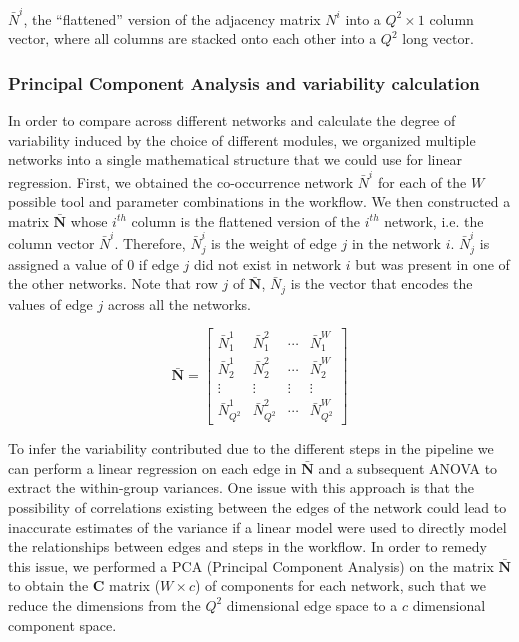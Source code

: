 \documentclass[letterpaper,12pt]{article}
\begin{document}
  $\bar{N}^i$, the ``flattened'' version of the adjacency matrix $N^i$ into a $Q^2 \times 1$ column vector, where all columns are stacked onto each other into a $Q^2$ long vector.


  \subsubsection*{Principal Component Analysis and variability calculation}
  \vspace{-5mm}
   In order to compare across different networks and calculate the degree of variability induced by the choice of different modules, we organized multiple networks into a single mathematical structure that we could use for linear regression.
   First, we obtained the co-occurrence network $\bar{N}^i$ for each of the $W$ possible tool and parameter combinations in the workflow.
   We then constructed a matrix $\mathbf{\bar{N}}$ whose $i^{th}$ column is the flattened version of the $i^{th}$ network, i.e. the column vector $\bar{N}^i$.
   Therefore, $\bar{N}^i_j$ is the weight of edge $j$ in the network $i$.
   $\bar{N}^i_j$ is assigned a value of 0 if edge $j$ did not exist in network $i$ but was present in one of the other networks.
   Note that row $j$ of $\mathbf{\bar{N}}$, $\bar{N}_j$ is the vector that encodes the values of edge $j$ across all the networks.

  \begin{equation*}
   \mathbf{\bar{N}} =
      \begin{bmatrix}
       \bar{N}^1_1 & \bar{N}^2_1 & \cdots  & \bar{N}^{W}_1  \\
       \bar{N}^1_2 & \bar{N}^2_2 & \cdots  & \bar{N}^{W}_2 \\
       \vdots & \vdots & \vdots  & \vdots \\
       \bar{N}^1_{Q^2} & \bar{N}^2_{Q^2} & \cdots  & \bar{N}^{W}_{Q^2}
      \end{bmatrix}
  \end{equation*}

  To infer the variability contributed due to the different steps in the pipeline we can perform a linear regression on each edge in $\mathbf{\bar{N}}$ and a subsequent ANOVA to extract the within-group variances.
  One issue with this approach is that the possibility of correlations existing between the edges of the network could lead to inaccurate estimates of the variance if a linear model were used to directly model the relationships between edges and steps in the workflow.
  In order to remedy this issue, we performed a PCA (Principal Component Analysis) on the matrix $\mathbf{\bar{N}}$ to obtain the $\mathbf{C}$ matrix ($W \times c$) of components for each network, such that we reduce the dimensions from the $Q^2$ dimensional edge space to a $c$ dimensional component space.
\end{document}
